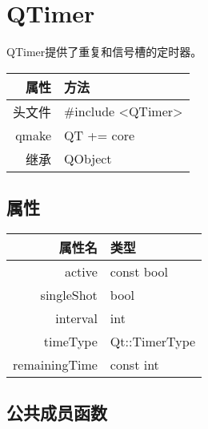 \chapter{QTimer}

QTimer提供了重复和信号槽的定时器。

\begin{tabular}{|r|l|}
	\hline
	属性 & 方法 \\
	\hline
	头文件 & \#include <QTimer>\\      
	\hline
	qmake & QT += core\\      
	\hline
	继承	  & QObject \\ 
	\hline
\end{tabular}

\section{属性}

\begin{tabular}{|r|l|}
	\hline
属性名	 & 类型 \\ 
\hline
active	& const bool\\
\hline
singleShot	& bool\\
\hline
interval &	int\\
\hline
timeType	& Qt::TimerType\\
\hline
remainingTime &	const int\\
	\hline
\end{tabular}


\section{公共成员函数}

